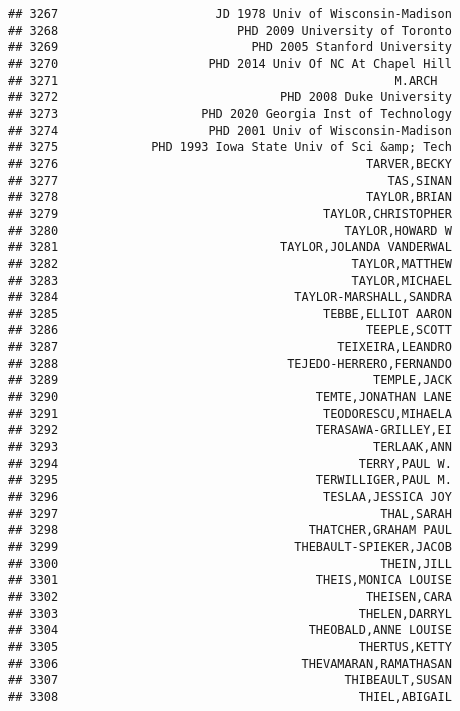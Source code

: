 \documentclass[
]{article}
\begin{document}
\begin{verbatim}
## 3267                      JD 1978 Univ of Wisconsin-Madison
## 3268                         PHD 2009 University of Toronto
## 3269                           PHD 2005 Stanford University
## 3270                     PHD 2014 Univ Of NC At Chapel Hill
## 3271                                               M.ARCH  
## 3272                               PHD 2008 Duke University
## 3273                    PHD 2020 Georgia Inst of Technology
## 3274                     PHD 2001 Univ of Wisconsin-Madison
## 3275             PHD 1993 Iowa State Univ of Sci &amp; Tech
## 3276                                           TARVER,BECKY
## 3277                                              TAS,SINAN
## 3278                                           TAYLOR,BRIAN
## 3279                                     TAYLOR,CHRISTOPHER
## 3280                                        TAYLOR,HOWARD W
## 3281                               TAYLOR,JOLANDA VANDERWAL
## 3282                                         TAYLOR,MATTHEW
## 3283                                         TAYLOR,MICHAEL
## 3284                                 TAYLOR-MARSHALL,SANDRA
## 3285                                     TEBBE,ELLIOT AARON
## 3286                                           TEEPLE,SCOTT
## 3287                                       TEIXEIRA,LEANDRO
## 3288                                TEJEDO-HERRERO,FERNANDO
## 3289                                            TEMPLE,JACK
## 3290                                    TEMTE,JONATHAN LANE
## 3291                                     TEODORESCU,MIHAELA
## 3292                                    TERASAWA-GRILLEY,EI
## 3293                                            TERLAAK,ANN
## 3294                                          TERRY,PAUL W.
## 3295                                    TERWILLIGER,PAUL M.
## 3296                                     TESLAA,JESSICA JOY
## 3297                                             THAL,SARAH
## 3298                                   THATCHER,GRAHAM PAUL
## 3299                                 THEBAULT-SPIEKER,JACOB
## 3300                                             THEIN,JILL
## 3301                                    THEIS,MONICA LOUISE
## 3302                                           THEISEN,CARA
## 3303                                          THELEN,DARRYL
## 3304                                   THEOBALD,ANNE LOUISE
## 3305                                          THERTUS,KETTY
## 3306                                  THEVAMARAN,RAMATHASAN
## 3307                                        THIBEAULT,SUSAN
## 3308                                          THIEL,ABIGAIL

\end{verbatim}
\end{document}
